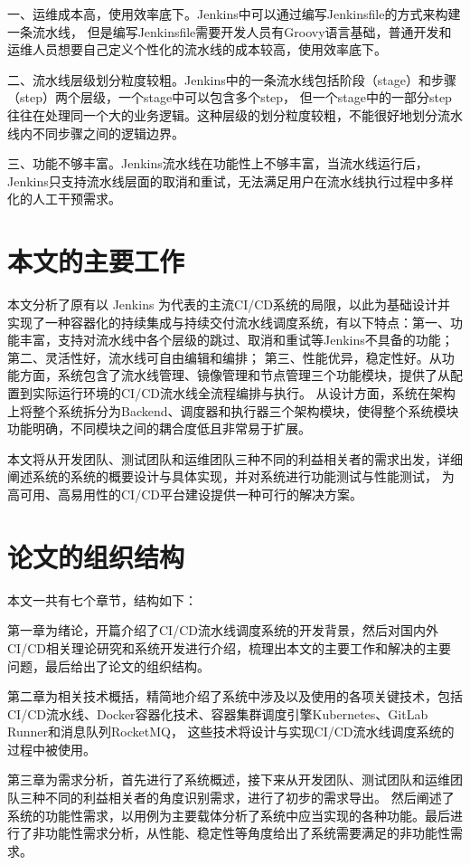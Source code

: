 一、运维成本高，使用效率底下。Jenkins中可以通过编写Jenkinsfile的方式来构建一条流水线，
但是编写Jenkinsfile需要开发人员有Groovy语言基础，普通开发和运维人员想要自己定义个性化的流水线的成本较高，使用效率底下。

二、流水线层级划分粒度较粗。Jenkins中的一条流水线包括阶段（stage）和步骤（step）两个层级，一个stage中可以包含多个step，
但一个stage中的一部分step往往在处理同一个大的业务逻辑。这种层级的划分粒度较粗，不能很好地划分流水线内不同步骤之间的逻辑边界。

三、功能不够丰富。Jenkins流水线在功能性上不够丰富，当流水线运行后，Jenkins只支持流水线层面的取消和重试，无法满足用户在流水线执行过程中多样化的人工干预需求。


\section{本文的主要工作}
本文分析了原有以 Jenkins 为代表的主流CI/CD系统的局限，以此为基础设计并实现了一种容器化的持续集成与持续交付流水线调度系统，有以下特点：第一、功能丰富，支持对流水线中各个层级的跳过、取消和重试等Jenkins不具备的功能；
第二、灵活性好，流水线可自由编辑和编排；
第三、性能优异，稳定性好。从功能方面，系统包含了流水线管理、镜像管理和节点管理三个功能模块，提供了从配置到实际运行环境的CI/CD流水线全流程编排与执行。
从设计方面，系统在架构上将整个系统拆分为Backend、调度器和执行器三个架构模块，使得整个系统模块功能明确，不同模块之间的耦合度低且非常易于扩展。

本文将从开发团队、测试团队和运维团队三种不同的利益相关者的需求出发，详细阐述系统的系统的概要设计与具体实现，并对系统进行功能测试与性能测试，
为高可用、高易用性的CI/CD平台建设提供一种可行的解决方案。

\section{论文的组织结构}
本文一共有七个章节，结构如下：

第一章为绪论，开篇介绍了CI/CD流水线调度系统的开发背景，然后对国内外CI/CD相关理论研究和系统开发进行介绍，梳理出本文的主要工作和解决的主要问题，最后给出了论文的组织结构。

第二章为相关技术概括，精简地介绍了系统中涉及以及使用的各项关键技术，包括CI/CD流水线、Docker容器化技术、容器集群调度引擎Kubernetes、GitLab Runner和消息队列RocketMQ，
这些技术将设计与实现CI/CD流水线调度系统的过程中被使用。

第三章为需求分析，首先进行了系统概述，接下来从开发团队、测试团队和运维团队三种不同的利益相关者的角度识别需求，进行了初步的需求导出。
然后阐述了系统的功能性需求，以用例为主要载体分析了系统中应当实现的各种功能。最后进行了非功能性需求分析，从性能、稳定性等角度给出了系统需要满足的非功能性需求。

